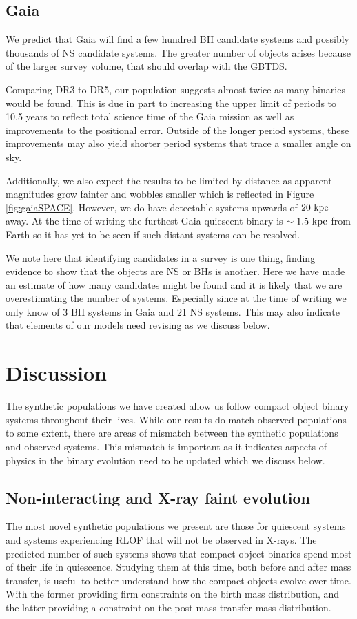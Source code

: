\documentclass{pas}
\begin{document}
\subsection{Gaia}\label{gaiaresultsection}

We predict that Gaia will find a few hundred BH candidate systems and possibly thousands of NS candidate systems. The greater number of objects arises because of the larger survey volume, that should overlap with the GBTDS.

Comparing DR3 to DR5, our population suggests almost twice as many binaries would be found. This is due in part to increasing the upper limit of periods to 10.5 years to reflect total science time of the Gaia mission as well as improvements to the positional error. Outside of the longer period systems, these improvements may also yield shorter period systems that trace a smaller angle on sky. 

Additionally, we also expect the results to be limited by distance as apparent magnitudes grow fainter and wobbles smaller which is reflected in Figure \ref{fig:gaiaSPACE}. However, we do have detectable systems upwards of $20~\rm{kpc}$ away. At the time of writing the furthest Gaia quiescent binary is $\sim1.5~\rm{kpc}$ from Earth so it has yet to be seen if such distant systems can be resolved. 

We note here that identifying candidates in a survey is one thing, finding evidence to show that the objects are NS or BHs is another. Here we have made an estimate of how many candidates might be found and it is likely that we are overestimating the number of systems. Especially since at the time of writing we only know of 3 BH systems in Gaia and 21 NS systems. This may also indicate that elements of our models need revising as we discuss below.

\section{Discussion}\label{disc}
The synthetic populations we have created allow us follow compact object binary systems throughout their lives. While our results do match observed populations to some extent, there are areas of mismatch between the synthetic populations and observed systems. This mismatch is important as it indicates aspects of physics in the binary evolution need to be updated which we discuss below.

\subsection{Non-interacting and X-ray faint evolution}\label{quindisc}
The most novel synthetic populations we present are those for quiescent systems and systems experiencing RLOF that will not be observed in X-rays. The predicted number of such systems shows that compact object binaries spend most of their life in quiescence. Studying them at this time, both before and after mass transfer, is useful to better understand how the compact objects evolve over time. With the former providing firm constraints on the birth mass distribution, and the latter providing a constraint on the post-mass transfer mass distribution. 
\end{document}
